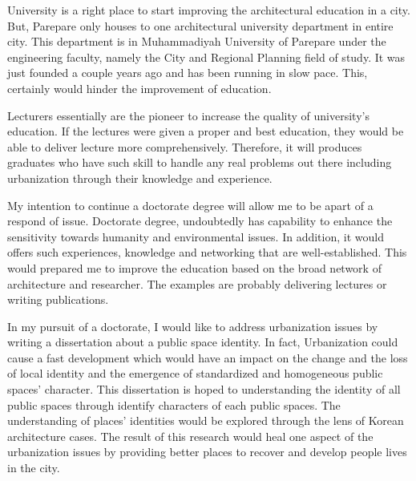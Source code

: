 \documentclass[../main.tex]{subfiles}
\begin{document}
\begin{tcolorbox}
	University is a right place to start improving the architectural education in a city.
	But, Parepare only houses to one architectural university department in entire city.
	This department is in Muhammadiyah University of Parepare under the engineering faculty, namely the City and Regional Planning field of study.
	It was just founded a couple years ago and has been running in slow pace. This, certainly would hinder the improvement of education.

	Lecturers essentially are the pioneer to increase the quality of university's education.
	If the lectures were given a proper and best education, they would be able to deliver lecture more comprehensively.
	Therefore, it will produces graduates who have such skill to handle any real problems out there including urbanization through their knowledge and experience.

	My intention to continue a doctorate degree will allow me to be apart of a respond of issue.
	Doctorate degree, undoubtedly has capability to enhance the sensitivity towards humanity and environmental issues.
	In addition, it would offers such experiences, knowledge and networking that are well-established.
	This would prepared me to improve the education based on the broad network of architecture and researcher. The examples are probably delivering lectures or writing publications.


	In my pursuit of a doctorate, I would like to address urbanization issues by writing a dissertation about  a public space identity. In fact, Urbanization  could cause a fast development which would have an impact on the change and the loss of local identity and the emergence of standardized and homogeneous public spaces' character.  This dissertation is hoped to understanding the identity of all public spaces through identify characters of each public spaces. The understanding of places' identities would be explored through the lens of Korean architecture cases. The result of this research would heal one aspect of the urbanization issues by providing better places to recover and develop people lives in the city.


\end{tcolorbox}
\end{document}
